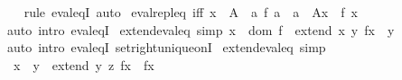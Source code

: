 \begin{isabellebody}
%
\isadelimproof
\ \ %
\endisadelimproof
%
\isatagproof
{}\isamarkupfalse%
\ {\isacharparenleft}{\kern0pt}rule\ eval{\isacharunderscore}{\kern0pt}eqI{\isacharparenright}{\kern0pt}\ auto%
\endisatagproof
{\isafoldproof}%
%
\isadelimproof
\isanewline
%
\endisadelimproof
\isanewline
{}\isamarkupfalse%
\ eval{\isacharunderscore}{\kern0pt}repl{\isacharunderscore}{\kern0pt}eq\ {\isacharbrackleft}{\kern0pt}iff{\isacharbrackright}{\kern0pt}{\isacharcolon}{\kern0pt}\ {\isachardoublequoteopen}x\ {\isasymin}\ A\ {\isasymLongrightarrow}\ {\isacharbraceleft}{\kern0pt}{\isasymlangle}a{\isacharcomma}{\kern0pt}\ f\ a{\isasymrangle}\ {\isacharbar}{\kern0pt}\ a\ {\isasymin}\ A{\isacharbraceright}{\kern0pt}{\isacharbackquote}{\kern0pt}x\ {\isacharequal}{\kern0pt}\ f\ x{\isachardoublequoteclose}\isanewline
%
\isadelimproof
\ \ %
\endisadelimproof
%
\isatagproof
{}\isamarkupfalse%
\ {\isacharparenleft}{\kern0pt}auto\ intro{\isacharcolon}{\kern0pt}\ eval{\isacharunderscore}{\kern0pt}eqI{\isacharparenright}{\kern0pt}%
\endisatagproof
{\isafoldproof}%
%
\isadelimproof
\isanewline
%
\endisadelimproof
\isanewline
{}\isamarkupfalse%
\ extend{\isacharunderscore}{\kern0pt}eval{\isacharunderscore}{\kern0pt}eq\ {\isacharbrackleft}{\kern0pt}simp{\isacharbrackright}{\kern0pt}{\isacharcolon}{\kern0pt}\ {\isachardoublequoteopen}x\ {\isasymnotin}\ dom\ f\ {\isasymLongrightarrow}\ {\isacharparenleft}{\kern0pt}extend\ x\ y\ f{\isacharparenright}{\kern0pt}{\isacharbackquote}{\kern0pt}x\ {\isacharequal}{\kern0pt}\ y{\isachardoublequoteclose}\isanewline
%
\isadelimproof
\ \ %
\endisadelimproof
%
\isatagproof
{}\isamarkupfalse%
\ {\isacharparenleft}{\kern0pt}auto\ intro{\isacharbang}{\kern0pt}{\isacharcolon}{\kern0pt}\ eval{\isacharunderscore}{\kern0pt}eqI{\isacharprime}{\kern0pt}\ set{\isacharunderscore}{\kern0pt}right{\isacharunderscore}{\kern0pt}unique{\isacharunderscore}{\kern0pt}onI{\isacharparenright}{\kern0pt}%
\endisatagproof
{\isafoldproof}%
%
\isadelimproof
\isanewline
%
\endisadelimproof
\isanewline
{}\isamarkupfalse%
\ extend{\isacharunderscore}{\kern0pt}eval{\isacharunderscore}{\kern0pt}eq{\isacharprime}{\kern0pt}\ {\isacharbrackleft}{\kern0pt}simp{\isacharbrackright}{\kern0pt}{\isacharcolon}{\kern0pt}\isanewline
\ \ {\isachardoublequoteopen}x\ {\isasymnoteq}\ y\ {\isasymLongrightarrow}\ {\isacharparenleft}{\kern0pt}extend\ y\ z\ f{\isacharparenright}{\kern0pt}{\isacharbackquote}{\kern0pt}x\ {\isacharequal}{\kern0pt}\ f{\isacharbackquote}{\kern0pt}x{\isachardoublequoteclose}\isanewline
%
\isadelimproof

\end{isabellebody}
